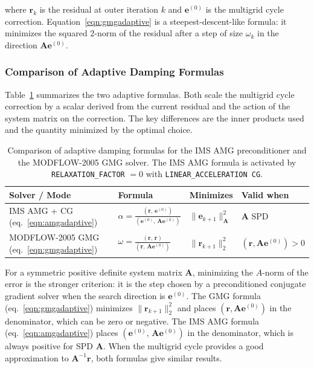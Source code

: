 \noindent where $\mathbf{r}_k$ is the residual at outer iteration $k$ and $\mathbf{e}^{(0)}$ is the multigrid cycle correction. Equation~\ref{eqn:gmgadaptive} is a steepest-descent-like formula: it minimizes the squared 2-norm of the residual after a step of size $\omega_k$ in the direction $\mathbf{A}\mathbf{e}^{(0)}$.

\subsubsection{Comparison of Adaptive Damping Formulas}

Table~\ref{table:amg_damp_compare} summarizes the two adaptive formulas. Both scale the multigrid cycle correction by a scalar derived from the current residual and the action of the system matrix on the correction. The key differences are the inner products used and the quantity minimized by the optimal choice.

\begin{table}[!ht]
  \small
  \begin{center}
  \caption[Comparison of adaptive damping formulas for AMG and GMG solvers]{%
    Comparison of adaptive damping formulas for the IMS AMG preconditioner
    and the MODFLOW-2005 GMG solver. The IMS AMG formula is activated by
    \texttt{RELAXATION\_FACTOR} $= 0$ with \texttt{LINEAR\_ACCELERATION CG}.}
  \label{table:amg_damp_compare}
  \begin{tabular}{llll}
    \toprule
    \textbf{Solver / Mode} & \textbf{Formula} & \textbf{Minimizes} & \textbf{Valid when} \\
    \midrule
    IMS AMG + CG (eq.~\ref{eqn:amgadaptive}) &
      $\displaystyle\alpha = \frac{(\mathbf{r},\,\mathbf{e}^{(0)})}{(\mathbf{e}^{(0)},\,\mathbf{A}\mathbf{e}^{(0)})}$ &
      $\|\mathbf{e}_{k+1}\|_{\mathbf{A}}^2$ &
      $\mathbf{A}$ SPD \\[10pt]
    MODFLOW-2005 GMG (eq.~\ref{eqn:gmgadaptive}) &
      $\displaystyle\omega = \frac{(\mathbf{r},\,\mathbf{r})}{(\mathbf{r},\,\mathbf{A}\mathbf{e}^{(0)})}$ &
      $\|\mathbf{r}_{k+1}\|_2^2$ &
      $(\mathbf{r},\mathbf{A}\mathbf{e}^{(0)}) > 0$ \\
    \bottomrule
  \end{tabular}
  \end{center}
\end{table}

For a symmetric positive definite system matrix $\mathbf{A}$, minimizing the $A$-norm of the error is the stronger criterion: it is the step chosen by a preconditioned conjugate gradient solver when the search direction is $\mathbf{e}^{(0)}$. The GMG formula (eq.~\ref{eqn:gmgadaptive}) minimizes $\|\mathbf{r}_{k+1}\|_2^2$ and places $(\mathbf{r}, \mathbf{A}\mathbf{e}^{(0)})$ in the denominator, which can be zero or negative. The IMS AMG formula (eq.~\ref{eqn:amgadaptive}) places $(\mathbf{e}^{(0)},\,\mathbf{A}\mathbf{e}^{(0)})$ in the denominator, which is always positive for SPD $\mathbf{A}$. When the multigrid cycle provides a good approximation to $\mathbf{A}^{-1}\mathbf{r}$, both formulas give similar results.

